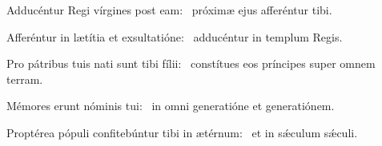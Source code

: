 \item Adducéntur Regi vírgines post eam:~\psstar{} próximæ ejus afferéntur tibi.

\item Afferéntur in lætítia et exsultatióne:~\psstar{} adducéntur in templum Regis.

\item Pro pátribus tuis nati sunt tibi fílii:~\psstar{} constítues eos príncipes super omnem terram.

\item Mémores erunt nóminis tui:~\psstar{} in omni generatióne et generatiónem.

\item Proptérea pópuli confitebúntur tibi in ætérnum:~\psstar{} et in sǽculum sǽculi.
